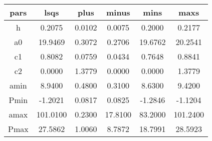 \begin{table}
\begin{tabular}{cccccc}
\hline \hline
pars & lsqs & plus & minus & mins & maxs \\
\hline
h & 0.2075 & 0.0102 & 0.0075 & 0.2000 & 0.2177 \\
a0 & 19.9469 & 0.3072 & 0.2706 & 19.6762 & 20.2541 \\
c1 & 0.8082 & 0.0759 & 0.0434 & 0.7648 & 0.8841 \\
c2 & 0.0000 & 1.3779 & 0.0000 & 0.0000 & 1.3779 \\
amin & 8.9400 & 0.4800 & 0.3100 & 8.6300 & 9.4200 \\
Pmin & -1.2021 & 0.0817 & 0.0825 & -1.2846 & -1.1204 \\
amax & 101.0100 & 0.2300 & 17.8100 & 83.2000 & 101.2400 \\
Pmax & 27.5862 & 1.0060 & 8.7872 & 18.7991 & 28.5923 \\
\hline
\end{tabular}
\end{table}
